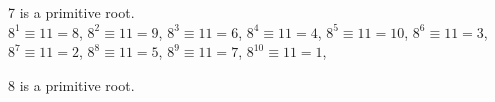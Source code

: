 {\begin{enumerate}
              7 is a primitive root. \\

              \(8^1 \equiv 11 = 8\),
              \(8^2 \equiv 11 = 9\),
              \(8^3 \equiv 11 = 6\),
              \(8^4 \equiv 11 = 4\),
              \(8^5 \equiv 11 = 10\),
              \(8^6 \equiv 11 = 3\),
              \(8^7 \equiv 11 = 2\),
              \(8^8 \equiv 11 = 5\),
              \(8^9 \equiv 11 = 7\),
              \(8^{10} \equiv 11 = 1\),

              8 is a primitive root.
    \end{enumerate}
}

